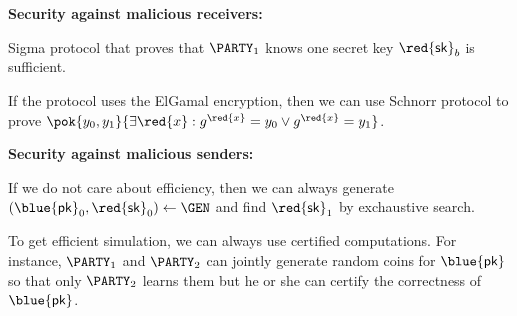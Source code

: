 \documentclass[landscape,dvips,footrule]{foils}
\renewcommand{\SK}{{\red{\mathsf{sk}}}}
\renewcommand{\PK}{{\blue{\mathsf{pk}}}}
\begin{document}

\textbf{Security against malicious receivers:} 
\begin{triangles}
\item Sigma protocol that proves that $\PARTY_1$ knows one secret key
  $\SK_b$ is sufficient.
  \item If the protocol uses the ElGamal encryption, then we can use
  Schnorr protocol to prove $\pok{y_0,y_1}{\exists \red{x}: g^{\red{x}}=y_0\vee g^{\red{x}}=y_1}$.
\end{triangles}
\Bigskip

\textbf{Security against malicious senders:} 
\begin{triangles}
\item If we do not care about efficiency, then we can always generate
  $(\PK_0,\SK_0)\gets\GEN$ and find $\SK_1$ by exchaustive search.
\item To get efficient simulation, we can always use certified
  computations. For instance, $\PARTY_1$ and $\PARTY_2$ can jointly
  generate random coins for $\PK$ so that only $\PARTY_2$ learns them
  but he or she can certify the correctness of $\PK$.
\end{triangles}
\end{document}
